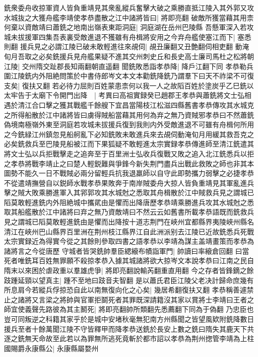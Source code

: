 銑衆委舟收掠軍資人皆負重靖見其衆亂縱兵奮擊大破之乘勝直抵江陵入其外郭又攻水城抜之大獲舟艦李靖使孝恭盡散之江中諸將皆曰|{
	將即亮翻}
破敵所獲當藉其用柰何棄以資敵靖曰蕭銑之地南出嶺表東距洞庭|{
	洞庭湖在岳州巴陵縣}
吾懸軍深入若攻城未拔援軍四集吾表裏受敵進退不獲雖有舟楫將安用之今弃舟艦使塞江而下|{
	塞悉則翻}
援兵見之必謂江陵已破未敢輕進往來覘伺|{
	覘丑廉翻又丑艶翻伺相吏翻}
動淹旬月吾取之必矣銑援兵見舟艦果疑不進其交州刺史丘和長史高士廉司馬杜之松將朝江陵|{
	交州隋交趾郡長知兩翻朝直遥翻}
聞銑敗悉詣孝恭降|{
	降戶江翻下同}
孝恭勒兵圍江陵銑内外阻絶問策於中書侍郎岑文本文本勸銑降銑乃謂羣下曰天不祚梁不可復支矣|{
	復扶又翻}
若必待力屈則百姓蒙患柰何以我一人之故䧟百姓於塗炭乎乙巳銑以太牢告于太廟下令開門出降　|{
	考異曰高祖實録癸已趙郡王孝恭與蕭銑將文士弘相遇於清江合口擊之獲其戰艦千餘艘下宜昌當陽枝江松滋四縣舊書孝恭傳攻其水城克之所得船散於江中諸將皆曰虜得賊船當藉其用何為弃之無乃資賊邪孝恭曰不然蕭銑偽境南極嶺外東至洞庭若攻城未拔援兵復到我則内外受敵進退不可雖有舟楫何所用之今銑緑江州鎮忽見船舸亂下必知銑敗未敢進兵來去覘伺動淹旬月用緩其救吾克之必矣銑救兵至巴陵見船被江而下果狐疑不敢輕進太宗實録孝恭傳進師至清江銑遣其將文士弘以兵拒戰擊走之追奔至于百里洲士弘收兵復戰又敗之追入北江銑悉兵以拒之孝恭將戰李靖止之曰楚人輕鋭難與爭鋒今新失荆門盡兵出戰此救敗之師也非其本圖勢不能久一日不戰賊必兩分留輕兵抗我退羸師以自守此即勢攜力弱擊之必捷孝恭不從遣靖撫營自以鋭師水戰孝恭果敗奔于南岸賊委舟大掠人皆負重靖見其軍亂進兵擊之賊大敗乘勝進軍入其郛郭攻其水城尅之悉取其舟楫散於江中賊救兵見之謂城已䧟莫敢輕進銑内外阻絶城中攜貮由是懼而出降唐歷孝恭靖乘勝進兵攻其水城尅之悉取其船艦散於江中諸將曰弃之無乃資敵靖曰不然云云如舊書所載孝恭語既而銑救兵見之謂城已䧟莫敢輕進銑由是懼而出降按十道志荆門在峽州宜都縣界夷陵峽州縣名清江在峽州巴山縣界百里洲在荆州枝江縣界江自此洲派别去江陵已近故銑悉兵死戰太宗實録近為得實今從之其餘則參取四書之語孝恭以李靖為謀主盖靖畫策而孝恭為諸將言之今從唐歷}
守城者皆哭銑帥羣臣緦縗布幘詣軍門|{
	帥讀曰率縗倉回翻}
曰當死者唯銑耳百姓無罪願不殺掠孝恭入據其城諸將欲大掠岑文本說孝恭曰江南之民自隋末以來困於虐政重以羣雄虎爭|{
	將即亮翻說輸芮翻重直用翻}
今之存者皆鋒鏑之餘跂踵延頸以望真主|{
	踵不至地曰跂音夫智翻}
是以蕭氏君臣江陵父老决計歸命庶幾有所息肩今若縱兵俘掠恐自此以南無復向化之心矣|{
	幾居希翻復扶又翻}
孝恭稱善遽禁止之諸將又言梁之將帥與官軍拒鬬死者其罪既深請籍沒其家以賞將士李靖曰王者之師宜使義聲先路彼為其主鬭死|{
	將即亮翻帥所類翻先悉薦翻下同為于偽翻}
乃忠臣也豈可同叛逆之科籍其家乎於是城中安堵秋毫無犯南方州縣聞之皆望風欵附銑降數日援兵至者十餘萬聞江陵不守皆釋甲而降孝恭送銑於長安上數之銑曰隋失其鹿天下共逐之銑無天命故至此若以為罪無所逃死竟斬於都市詔以孝恭為荆州揔管李靖為上柱國賜爵永康縣公|{
	永康縣屬婺州}
